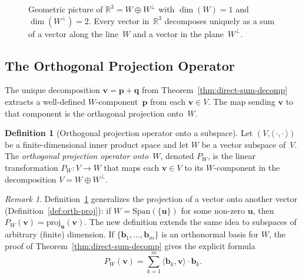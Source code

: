 \documentclass[11pt, a4paper, notitlepage]{report}
\theoremstyle{definition}
\newtheorem{definition}[theorem]{Definition}
\theoremstyle{remark}
\newtheorem{remark}[theorem]{Remark}
\begin{document}
\begin{figure}[h]
\centering
{}
\caption{Geometric picture of $\mathbb{R}^3 = W\oplus W^\perp$ with
$\dim(W) = 1$ and $\dim(W^\perp) = 2$. Every vector in~$\mathbb{R}^3$ decomposes
uniquely as a sum of a vector along the line~$W$ and a vector in the plane~$W^\perp$.}
\label{fig:direct-sum-R3}
\end{figure}

\subsection{The Orthogonal Projection Operator}
\label{subsec:orth-proj-operator}

The unique decomposition $\mathbf{v} = \mathbf{p} + \mathbf{q}$ from
Theorem~\ref{thm:direct-sum-decomp} extracts a well-defined
$W$-component~$\mathbf{p}$ from each $\mathbf{v}\in V$. The map sending
$\mathbf{v}$ to that component is the orthogonal projection onto~$W$.

\begin{definition}[Orthogonal projection operator onto a subspace]
\label{def:orth-proj-operator}
Let $(V,\langle\,\cdot,\cdot\,\rangle)$ be a finite-dimensional inner
product space and let $W$ be a vector subspace of~$V$. The
\emph{orthogonal projection operator onto~$W$}, denoted $P_W$, is the
linear transformation $P_W : V \to W$ that maps each $\mathbf{v}\in V$ to its
$W$-component in the decomposition $V = W\oplus W^\perp$.
\end{definition}

\begin{remark}
Definition~\ref{def:orth-proj-operator} generalizes the projection of a
vector onto another vector (Definition~\ref{def:orth-proj}): if
$W = \mathrm{Span}(\{\mathbf{u}\})$ for some non-zero $\mathbf{u}$, then
$P_W(\mathbf{v}) = \mathrm{proj}_{\mathbf{u}}(\mathbf{v})$. The new
definition extends the same idea to subspaces of arbitrary (finite) dimension.
If $\{\mathbf{b}_1,\ldots,\mathbf{b}_m\}$ is an orthonormal basis for $W$,
the proof of Theorem~\ref{thm:direct-sum-decomp} gives the explicit formula
\[
  P_W(\mathbf{v}) = \sum_{k=1}^{m}\langle\mathbf{b}_k,\mathbf{v}\rangle\cdot\mathbf{b}_k.
\]
\end{remark}
\end{document}

